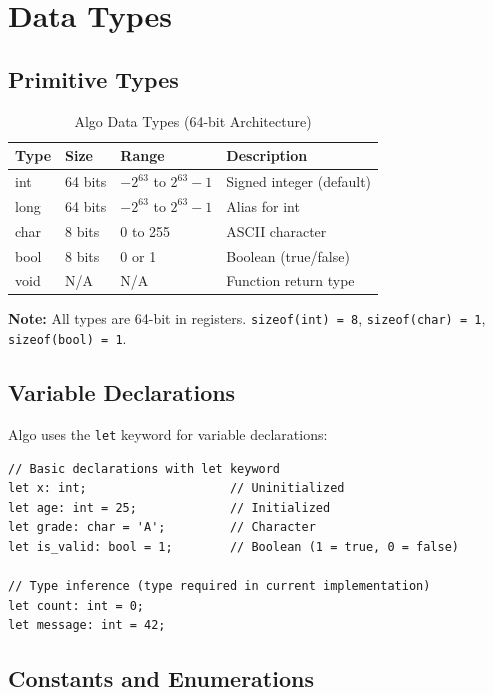 \documentclass[12pt,a4paper,oneside]{book}
\newcommand{\code}[1]{\texttt{#1}}
\begin{document}
\section{Data Types}

\subsection{Primitive Types}

\begin{table}[H]
\centering
\caption{Algo Data Types (64-bit Architecture)}
\begin{tabularx}{\textwidth}{|l|l|l|X|}
\hline
\textbf{Type} & \textbf{Size} & \textbf{Range} & \textbf{Description} \\
\hline
int & 64 bits & $-2^{63}$ to $2^{63}-1$ & Signed integer (default) \\
long & 64 bits & $-2^{63}$ to $2^{63}-1$ & Alias for int \\
char & 8 bits & 0 to 255 & ASCII character \\
bool & 8 bits & 0 or 1 & Boolean (true/false) \\
void & N/A & N/A & Function return type \\
\hline
\end{tabularx}
\end{table}

\textbf{Note:} All types are 64-bit in registers. \code{sizeof(int) = 8}, \code{sizeof(char) = 1}, \code{sizeof(bool) = 1}.

\subsection{Variable Declarations}

Algo uses the \code{let} keyword for variable declarations:

\begin{lstlisting}[style=algo, caption={Variable Declarations}]
// Basic declarations with let keyword
let x: int;                    // Uninitialized
let age: int = 25;             // Initialized
let grade: char = 'A';         // Character
let is_valid: bool = 1;        // Boolean (1 = true, 0 = false)

// Type inference (type required in current implementation)
let count: int = 0;
let message: int = 42;
\end{lstlisting}

\subsection{Constants and Enumerations}
\end{document}

